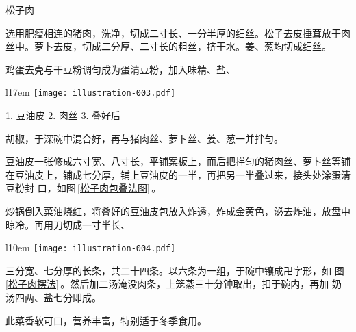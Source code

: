 \begin{recipe}{松子肉}

\ingredients


\preparation

\step 选用肥瘦相连的猪肉，洗净，切成二寸长、一分半厚的细丝。松子去皮捶茸放于肉
丝中。萝卜去皮，切成二分厚、二寸长的粗丝，挤干水。姜、葱均切成细丝。

\step 鸡蛋去壳与干豆粉调匀成为蛋清豆粉，加入味精、盐、
\begin{wrapfigure}[7]{l}{17em}%
\centering%
\vspace{-.4375\baselineskip}%
\texttt{[image: illustration-003.pdf]}%
\vspace{-.5625\baselineskip}%
\caption{松子肉包叠法图}%
\label{松子肉包叠法图}%
{\small 1. 豆油皮 2. 肉丝 3. 叠好后}%
\end{wrapfigure}%
胡椒，于深碗中混合好，再与猪肉丝、萝卜丝、姜、葱一并拌匀。

\step 豆油皮一张修成六寸宽、八寸长，平铺案板上，而后把拌匀的猪肉丝、萝卜丝等铺
在豆油皮上，铺成七分厚，铺上豆油皮的一半，再把另一半叠过来，接头处涂蛋淸豆粉封
口，如图\,\ref{松子肉包叠法图}\,。

\step 炒锅倒入菜油烧红，将叠好的豆油皮包放入炸透，炸成金黄色，泌去炸油，放盘中
晾冷。再用刀切成一寸半长、
\begin{wrapfigure}[5]{l}{10em}%
\centering%
\vspace{-1.25\baselineskip}%
\texttt{[image: illustration-004.pdf]}%
\vspace{-.5625\baselineskip}%
\caption{松子肉摆法}%
\label{松子肉摆法}%
\end{wrapfigure}%
三分宽、七分厚的长条，共二十四条。以六条为一组，于碗中镶成卍字形，如
图\,\ref{松子肉摆法}\,。然后加二汤淹没肉条，上笼蒸三十分钟取出，扣于碗内，再加
奶汤四两、盐七分即成。

\features

此菜香软可口，营养丰富，特别适于冬季食用。

\end{recipe}

